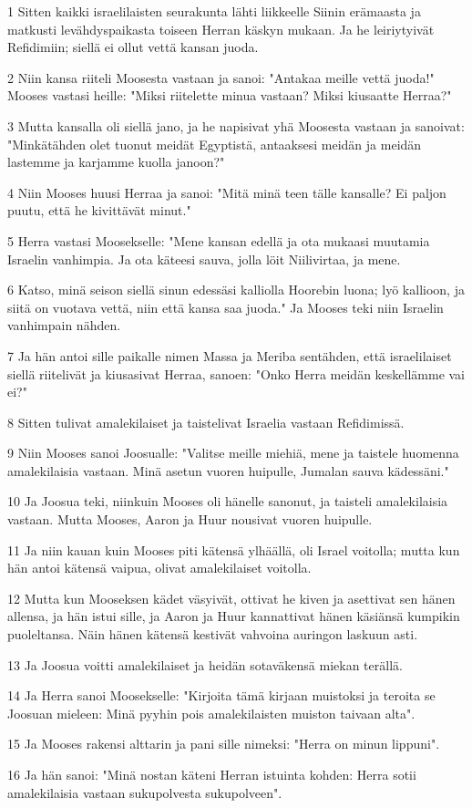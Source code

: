 \par 1 Sitten kaikki israelilaisten seurakunta lähti liikkeelle Siinin erämaasta ja matkusti levähdyspaikasta toiseen Herran käskyn mukaan. Ja he leiriytyivät Refidimiin; siellä ei ollut vettä kansan juoda.
\par 2 Niin kansa riiteli Moosesta vastaan ja sanoi: "Antakaa meille vettä juoda!" Mooses vastasi heille: "Miksi riitelette minua vastaan? Miksi kiusaatte Herraa?"
\par 3 Mutta kansalla oli siellä jano, ja he napisivat yhä Moosesta vastaan ja sanoivat: "Minkätähden olet tuonut meidät Egyptistä, antaaksesi meidän ja meidän lastemme ja karjamme kuolla janoon?"
\par 4 Niin Mooses huusi Herraa ja sanoi: "Mitä minä teen tälle kansalle? Ei paljon puutu, että he kivittävät minut."
\par 5 Herra vastasi Moosekselle: "Mene kansan edellä ja ota mukaasi muutamia Israelin vanhimpia. Ja ota käteesi sauva, jolla löit Niilivirtaa, ja mene.
\par 6 Katso, minä seison siellä sinun edessäsi kalliolla Hoorebin luona; lyö kallioon, ja siitä on vuotava vettä, niin että kansa saa juoda." Ja Mooses teki niin Israelin vanhimpain nähden.
\par 7 Ja hän antoi sille paikalle nimen Massa ja Meriba sentähden, että israelilaiset siellä riitelivät ja kiusasivat Herraa, sanoen: "Onko Herra meidän keskellämme vai ei?"
\par 8 Sitten tulivat amalekilaiset ja taistelivat Israelia vastaan Refidimissä.
\par 9 Niin Mooses sanoi Joosualle: "Valitse meille miehiä, mene ja taistele huomenna amalekilaisia vastaan. Minä asetun vuoren huipulle, Jumalan sauva kädessäni."
\par 10 Ja Joosua teki, niinkuin Mooses oli hänelle sanonut, ja taisteli amalekilaisia vastaan. Mutta Mooses, Aaron ja Huur nousivat vuoren huipulle.
\par 11 Ja niin kauan kuin Mooses piti kätensä ylhäällä, oli Israel voitolla; mutta kun hän antoi kätensä vaipua, olivat amalekilaiset voitolla.
\par 12 Mutta kun Mooseksen kädet väsyivät, ottivat he kiven ja asettivat sen hänen allensa, ja hän istui sille, ja Aaron ja Huur kannattivat hänen käsiänsä kumpikin puoleltansa. Näin hänen kätensä kestivät vahvoina auringon laskuun asti.
\par 13 Ja Joosua voitti amalekilaiset ja heidän sotaväkensä miekan terällä.
\par 14 Ja Herra sanoi Moosekselle: "Kirjoita tämä kirjaan muistoksi ja teroita se Joosuan mieleen: Minä pyyhin pois amalekilaisten muiston taivaan alta".
\par 15 Ja Mooses rakensi alttarin ja pani sille nimeksi: "Herra on minun lippuni".
\par 16 Ja hän sanoi: "Minä nostan käteni Herran istuinta kohden: Herra sotii amalekilaisia vastaan sukupolvesta sukupolveen".

